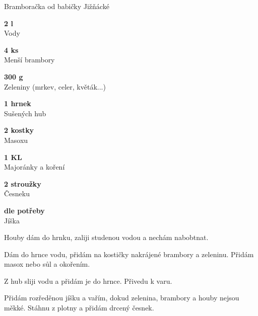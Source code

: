\documentclass[11pt,a4paper]{article}
\begin{document}
\begin{recipe}[OliveGreen]{Bramboračka od babičky Jižňácké}
    \begin{ingredients}
        \item \parbox[t]{\linewidth}{\raggedright \liquid \textbf{2 l}\\ Vody}
        \item \parbox[t]{\linewidth}{\raggedright \piece \textbf{4 ks}\\ Menší brambory}
        \item \parbox[t]{\linewidth}{\raggedright \weight \textbf{300 g}\\ Zeleniny (mrkev, celer, květák...)}
        \item \parbox[t]{\linewidth}{\raggedright \piece \textbf{1 hrnek}\\ Sušených hub}
        \item \parbox[t]{\linewidth}{\raggedright \piece \textbf{2 kostky}\\ Masoxu}
        \item \parbox[t]{\linewidth}{\raggedright \indefinite \textbf{1 KL}\\ Majoránky a koření}
        \item \parbox[t]{\linewidth}{\raggedright \piece \textbf{2 stroužky}\\ Česneku}
        \item \parbox[t]{\linewidth}{\raggedright \spoon \textbf{dle potřeby}\\ Jíška}
    \end{ingredients}
    \begin{steps}
        \item Houby dám do hrnku, zaliji studenou vodou a nechám nabobtnat. 
        \item Dám do hrnce vodu, přidám na kostičky nakrájené brambory a zeleninu. Přidám masox nebo sůl a okořením. 
        \item Z hub sliji vodu a přidám je do hrnce. Přivedu k varu. 
        \item Přidám rozředěnou jíšku a vařím, dokud zelenina, brambory a houby nejsou měkké. Stáhnu z plotny a přidám drcený česnek.
    \end{steps}
\end{recipe}
\end{document}
